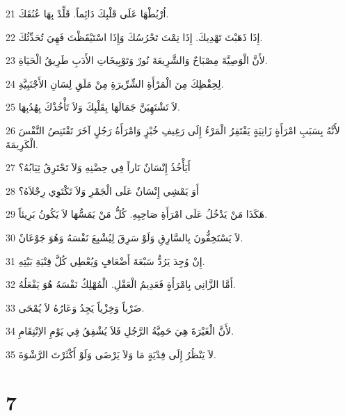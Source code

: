 \par 21 اُرْبُطْهَا عَلَى قَلْبِكَ دَائِماً. قَلِّدْ بِهَا عُنُقَكَ.
\par 22 إِذَا ذَهَبْتَ تَهْدِيكَ. إِذَا نِمْتَ تَحْرُسُكَ وَإِذَا اسْتَيْقَظْتَ فَهِيَ تُحَدِّثُكَ.
\par 23 لأَنَّ الْوَصِيَّةَ مِصْبَاحٌ وَالشَّرِيعَةَ نُورٌ وَتَوْبِيخَاتِ الأَدَبِ طَرِيقُ الْحَيَاةِ.
\par 24 لِحِفْظِكَ مِنَ الْمَرْأَةِ الشِّرِّيرَةِ مِنْ مَلَقِ لِسَانِ الأَجْنَبِيَّةِ.
\par 25 لاَ تَشْتَهِيَنَّ جَمَالَهَا بِقَلْبِكَ وَلاَ تَأْخُذْكَ بِهُدُبِهَا.
\par 26 لأَنَّهُ بِسَبَبِ امْرَأَةٍ زَانِيَةٍ يَفْتَقِرُ الْمَرْءُ إِلَى رَغِيفِ خُبْزٍ وَامْرَأَةُ رَجُلٍ آخَرَ تَقْتَنِصُ النَّفْسَ الْكَرِيمَةَ.
\par 27 أَيَأْخُذُ إِنْسَانٌ نَاراً فِي حِضْنِهِ وَلاَ تَحْتَرِقُ ثِيَابُهُ؟
\par 28 أَوَ يَمْشِي إِنْسَانٌ عَلَى الْجَمْرِ وَلاَ تَكْتَوِي رِجْلاَهُ؟
\par 29 هَكَذَا مَنْ يَدْخُلُ عَلَى امْرَأَةِ صَاحِبِهِ. كُلُّ مَنْ يَمَسُّهَا لاَ يَكُونُ بَرِيئاً.
\par 30 لاَ يَسْتَخِفُّونَ بِالسَّارِقِ وَلَوْ سَرِقَ لِيُشْبِعَ نَفْسَهُ وَهُوَ جَوْعَانٌ.
\par 31 إِنْ وُجِدَ يَرُدُّ سَبْعَةَ أَضْعَافٍ وَيُعْطِي كُلَّ قِنْيَةِ بَيْتِهِ.
\par 32 أَمَّا الزَّانِي بِامْرَأَةٍ فَعَدِيمُ الْعَقْلِ. الْمُهْلِكُ نَفْسَهُ هُوَ يَفْعَلُهُ.
\par 33 ضَرْباً وَخِزْياً يَجِدُ وَعَارُهُ لاَ يُمْحَى.
\par 34 لأَنَّ الْغَيْرَةَ هِيَ حَمِيَّةُ الرَّجُلِ فَلاَ يُشْفِقُ فِي يَوْمِ الاِنْتِقَامِ.
\par 35 لاَ يَنْظُرُ إِلَى فِدْيَةٍ مَا وَلاَ يَرْضَى وَلَوْ أَكْثَرْتَ الرَّشْوَةَ.

\chapter{7}

